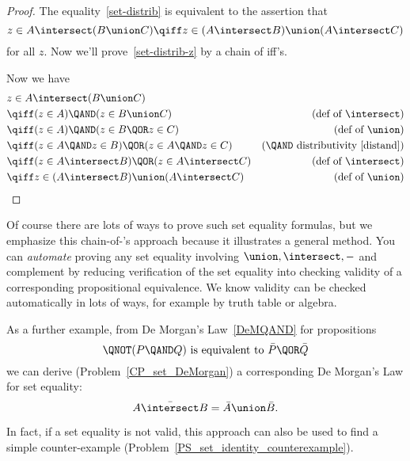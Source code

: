 \begin{proof}
The equality~\eqref{set-distrib} is equivalent to the assertion that
\begin{equation}\label{set-distrib-z}
  z \in A \intersect (B \union C) \qiff z \in (A \intersect B)
  \union (A \intersect C)
\end{equation}
for all $z$.  Now we'll prove~\eqref{set-distrib-z} by a chain of iff's.

Now we have
\begin{align*}
\lefteqn{z \in A \intersect (B \union C)}\\
& \qiff (z \in A) \QAND (z \in B \union C) & \text{(def of $\intersect$)}\\
& \qiff (z \in A) \QAND (z \in B \QOR z \in C)
                & \text{(def of $\union$)}\\
& \qiff (z \in A \QAND z \in B) \QOR (z \in A \QAND z \in C)
                & \text{(\QAND\ distributivity~\eqref{distand})}\\
& \qiff (z \in A \intersect B) \QOR (z \in A \intersect C)
                & \text{(def of $\intersect$)}\\
& \qiff z \in (A \intersect B) \union (A \intersect C)
                & \text{(def of $\union$)}
\end{align*}

\end{proof}
  
Of course there are lots of ways to prove such set equality formulas,
but we emphasize this chain-of-\QIFF's approach because it illustrates
a general method.  You can \emph{automate} proving any set equality
involving $\union, \intersect, -$ and complement by reducing
verification of the set equality into checking validity of a
corresponding propositional equivalence.  We know validity can be
checked automatically in lots of ways, for example by truth table or
algebra.

As a further example, from De Morgan's Law~\eqref{DeMQAND} for
propositions
\[
\QNOT(P \QAND Q)  \text{  is equivalent to  } \bar{P} \QOR \bar{Q}
\]
we can derive (Problem~\ref{CP_set_DeMorgan}) a corresponding De
Morgan's Law for set equality:
\begin{equation}\label{set-demorgan}
\bar{A \intersect B} = \bar{A} \union \bar{B}.
\end{equation}

In fact, if a set equality is not valid, this approach can also be
used to find a simple counter-example
(Problem~\ref{PS_set_identity_counterexample}).

